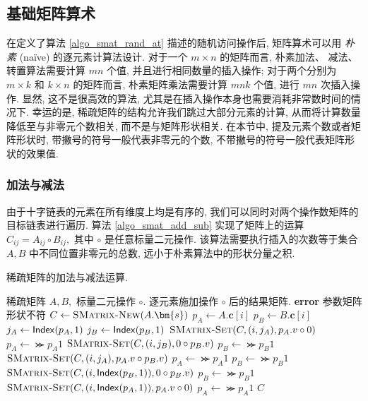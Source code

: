 \subsection{基础矩阵算术}

在定义了算法 \ref{algo_smat_rand_at} 描述的随机访问操作后, 矩阵算术可以用 \textit{朴素} (na\"{i}ve) 的逐元素计算法设计. 对于一个 $m \times n$ 的矩阵而言, 朴素加法、 减法、 转置算法需要计算 $mn$ 个值, 并且进行相同数量的插入操作; 对于两个分别为 $m \times k$ 和 $k \times n$ 的矩阵而言, 朴素矩阵乘法需要计算 $mnk$ 个值, 进行 $mn$ 次插入操作. 显然, 这不是很高效的算法, 尤其是在插入操作本身也需要消耗非常数时间的情况下. 幸运的是, 稀疏矩阵的结构允许我们跳过大部分元素的计算, 从而将计算数量降低至与非零元个数相关, 而不是与矩阵形状相关. 在本节中, 提及元素个数或者矩阵形状时, 带撇号的符号一般代表非零元的个数, 不带撇号的符号一般代表矩阵形状的效果值.

\subsubsection{加法与减法}

由于十字链表的元素在所有维度上均是有序的, 我们可以同时对两个操作数矩阵的目标链表进行遍历. 算法 \ref{algo_smat_add_sub} 实现了矩阵上的运算 $C_{ij} = A_{ij} \circ B_{ij},$ 其中 $\circ$ 是任意标量二元操作. 该算法需要执行插入的次数等于集合 $A, B$ 中不同位置非零元的总数, 远小于朴素算法中的形状分量之积.
\begin{breakablealgorithm}
\caption{稀疏矩阵的加法与减法运算.}
\label{algo_smat_add_sub}
\begin{algorithmic}[1]
\Require 稀疏矩阵 $A, B,$ 标量二元操作 $\circ.$
\Ensure 逐元素施加操作 $\circ$ 后的结果矩阵.
        \State \textbf{error} 参数矩阵形状不符
    \EndIf
    \State $C \gets \textsc{SMatrix-New}(A.\bm{s})$
        \State $p_A \gets A.\bm{c}[i]$
        \State $p_B \gets B.\bm{c}[i]$
                \State $j_A \gets \mathsf{Index}(p_A, 1)$
                \State $j_B \gets \mathsf{Index}(p_B, 1)$
                    \State $\textsc{SMatrix-Set}(C, (i, j_A), p_A.v \circ 0)$
                    \State $p_A \gets \Succ{p_A}{1}$
                    \State $\textsc{SMatrix-Set}(C, (i, j_B), 0 \circ p_B.v)$
                    \State $p_B \gets \Succ{p_B}{1}$
                \Else
                    \State $\textsc{SMatrix-Set}(C, (i, j_A), p_A.v \circ p_B.v)$
                    \State $p_A \gets \Succ{p_A}{1}$
                    \State $p_B \gets \Succ{p_B}{1}$
                \EndIf
                \State $\textsc{SMatrix-Set}(C, (i, \mathsf{Index}(p_B, 1)), 0 \circ p_B.v)$
                \State $p_B \gets \Succ{p_B}{1}$
            \Else
                \State $\textsc{SMatrix-Set}(C, (i, \mathsf{Index}(p_A, 1)), p_A.v \circ 0)$
                \State $p_A \gets \Succ{p_A}{1}$
            \EndIf
        \EndWhile
    \EndFor
    \State \Return $C$
\EndFunction
\end{algorithmic}
\end{breakablealgorithm}

